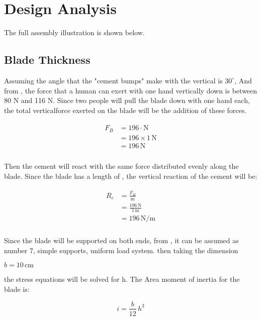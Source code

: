 \documentclass{article}
\begin{document}
\section{Design Analysis}

The full assembly illustration is shown below.

\subsection{Blade Thickness}

Assuming the angle that the "cement bumps" make with the vertical is $30^\circ$,
And from \cite[Figure 9.10]{shigley}, the force that a human can exert with one hand vertically down is between 80 N and 116 N. Since two people will pull the blade down with one hand each, the total verticalforce exerted on the blade will be the addition of these forces.

\begin{align}
\begin{split}
F_{B}	&= 196 \cdot \mathrm{N}\\
		&= 196 \times 1\,\mathrm{N}\\
		&= 196\,\mathrm{N}\\
\end{split}
\end{align}

Then the cement will react with the same force distributed evenly along the blade. Since the blade has a length of  , the vertical reaction of the cement will be:

\begin{align}
\begin{split}
R_{c}	&= \frac{F_{B}}{\mathrm{m}}\\
		&= \frac{196\,\mathrm{N}}{1\,\mathrm{m}}\\
		&= 196\,\mathrm{{N}\slash{m}}\\
\end{split}
\end{align}

Since the blade will be supported on both ends, from \cite[Table A-9]{shigley}, it can be assumed as number 7, simple supports, uniform load system. then taking the dimension

$b = 10\,\mathrm{cm}$

the stress equations will be solved for h. The Area moment of inertia for the blade is:

\begin{equation}
i=\frac{b}{12} \, h^{3}
\end{equation}
\end{document}
